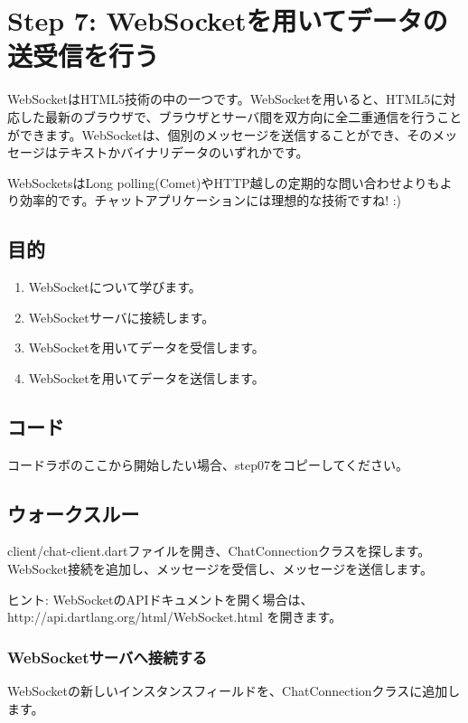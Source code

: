 \section{Step 7: WebSocketを用いてデータの送受信を行う}

WebSocketはHTML5技術の中の一つです。WebSocketを用いると、HTML5に対応した最新のブラウザで、ブラウザとサーバ間を双方向に全二重通信を行うことができます。WebSocketは、個別のメッセージを送信することができ、そのメッセージはテキストかバイナリデータのいずれかです。

WebSocketsはLong polling(Comet)やHTTP越しの定期的な問い合わせよりもより効率的です。チャットアプリケーションには理想的な技術ですね! :)

\subsection{目的}

\begin{enumerate}
\item WebSocketについて学びます。
\item WebSocketサーバに接続します。
\item WebSocketを用いてデータを受信します。
\item WebSocketを用いてデータを送信します。
\end{enumerate}

\subsection{コード}

コードラボのここから開始したい場合、step07をコピーしてください。

\subsection{ウォークスルー}

client/chat-client.dartファイルを開き、ChatConnectionクラスを探します。WebSocket接続を追加し、メッセージを受信し、メッセージを送信します。

ヒント: WebSocketのAPIドキュメントを開く場合は、http://api.dartlang.org/html/WebSocket.html を開きます。

\subsubsection{WebSocketサーバへ接続する}

WebSocketの新しいインスタンスフィールドを、ChatConnectionクラスに追加します。


